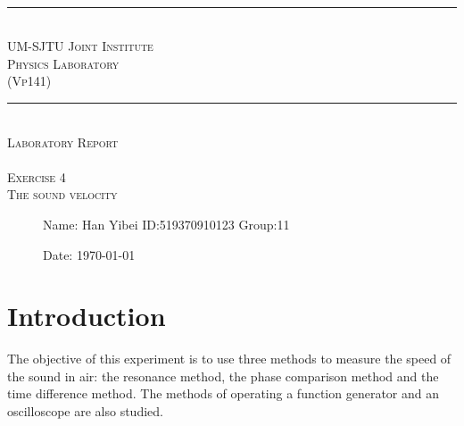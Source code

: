 \documentclass[12pt,a4paper]{article}
\begin{document}
\begin{center}
~\\
\rule[0mm]{400pt}{0.5pt}
\Large{ \textsc{\newline\\UM-SJTU Joint Institute\\Physics Laboratory\\(Vp141)\\}}
\rule[0mm]{400pt}{0.5pt}
\Large{ \textsc{\newline\newline\newline\newline\newline\newline\\
Laboratory Report\\}}
\Large{\textsc{ \\ Exercise 4  \\ The sound velocity} }

\end{center}

\begin{description}
    \item[] 
    \item[] 
    \item[] 
    \item[] 
    \item[] 
    \item[]
    \item[]\qquad \qquad Name: Han Yibei \qquad ID:519370910123   \qquad    Group:11\\
    \item[]\qquad \qquad Date: \today
\end{description}

\newpage


\section{Introduction}

The objective of this experiment is to use three methods to measure the speed of the sound in air: the resonance method, the phase comparison method and the time difference method. The methods of operating a function generator and an oscilloscope are also studied.
\end{document}
